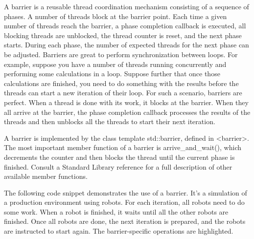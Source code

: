 A barrier is a reusable thread coordination mechanism consisting of a sequence of phases. A number of threads block at the barrier point. Each time a given number of threads reach the barrier, a phase completion callback is executed, all blocking threads are unblocked, the thread counter is reset, and the next phase starts. During each phase, the number of expected threads for the next phase can be adjusted. Barriers are great to perform synchronization between loops. For example, suppose you have a number of threads running concurrently and performing some calculations in a loop. Suppose further that once those calculations are finished, you need to do something with the results before the threads can start a new iteration of their loop. For such a scenario, barriers are perfect. When a thread is done with its work, it blocks at the barrier. When they all arrive at the barrier, the phase completion callback processes the results of the threads and then unblocks all the threads to start their next iteration.

A barrier is implemented by the class template std::barrier, defined in <barrier>. The most important member function of a barrier is arrive\_and\_wait(), which decrements the counter and then blocks the thread until the current phase is finished. Consult a Standard Library reference for a full description of other available member functions.

The following code snippet demonstrates the use of a barrier. It’s a simulation of a production environment using robots. For each iteration, all robots need to do some work. When a robot is finished, it waits until all the other robots are finished. Once all robots are done, the next iteration is prepared, and the robots are instructed to start again. The barrier-specific operations are highlighted.

